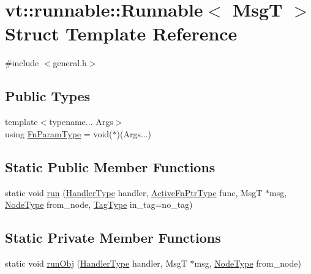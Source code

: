 \hypertarget{structvt_1_1runnable_1_1_runnable}{}\section{vt\+:\+:runnable\+:\+:Runnable$<$ MsgT $>$ Struct Template Reference}
\label{structvt_1_1runnable_1_1_runnable}


{\ttfamily \#include $<$general.\+h$>$}

\subsection*{Public Types}
\begin{DoxyCompactItemize}
\item 
{\footnotesize template$<$typename... Args$>$ }\\using \hyperlink{structvt_1_1runnable_1_1_runnable_aaad8725f31ab762ded7babaaf83574a3}{Fn\+Param\+Type} = void($\ast$)(Args...)
\end{DoxyCompactItemize}
\subsection*{Static Public Member Functions}
\begin{DoxyCompactItemize}
\item 
static void \hyperlink{structvt_1_1runnable_1_1_runnable_a8d99f9d7b1b29545b1595f40a1bd2845}{run} (\hyperlink{namespacevt_af64846b57dfcaf104da3ef6967917573}{Handler\+Type} handler, \hyperlink{namespacevt_a70e19bd64d031e65083c2125b2c65426}{Active\+Fn\+Ptr\+Type} func, MsgT $\ast$msg, \hyperlink{namespacevt_a866da9d0efc19c0a1ce79e9e492f47e2}{Node\+Type} from\+\_\+node, \hyperlink{namespacevt_a84ab281dae04a52a4b243d6bf62d0e52}{Tag\+Type} in\+\_\+tag=no\+\_\+tag)
\end{DoxyCompactItemize}
\subsection*{Static Private Member Functions}
\begin{DoxyCompactItemize}
\item 
static void \hyperlink{structvt_1_1runnable_1_1_runnable_a2d5b3dd7e10957359b1d57d94b219e18}{run\+Obj} (\hyperlink{namespacevt_af64846b57dfcaf104da3ef6967917573}{Handler\+Type} handler, MsgT $\ast$msg, \hyperlink{namespacevt_a866da9d0efc19c0a1ce79e9e492f47e2}{Node\+Type} from\+\_\+node)
\end{DoxyCompactItemize}

